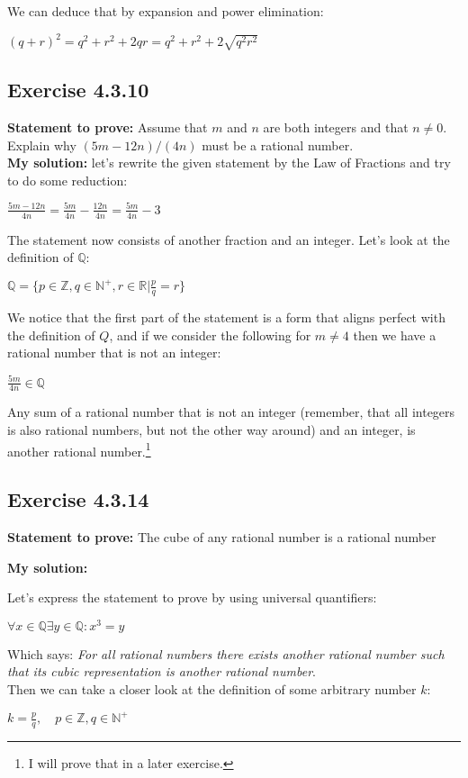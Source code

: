 \documentclass{article}
\newcommand{\cent}[1]{\begin{center}#1\end{center}}
\newcommand{\doubleR}{\mathbb{R}}
\newcommand{\doubleZ}{\mathbb{Z}}
\newcommand{\doubleN}{\mathbb{N}}
\newcommand{\doubleQ}{\mathbb{Q}}
\newcommand{\In}{\! \in \!}
\newcommand{\Prove}{\textbf{Statement to prove: }}
\newcommand{\Solution}{\textbf{My solution: }}
\newcommand{\QED}{\boxed{}}
\newcommand{\Exercise}[1]{\subsection{Exercise #1}}
\begin{document}
	 We can deduce that by expansion and power elimination:
	 
	\cent{$(q+r)^2 = q^2+r^2 + 2qr =q^2+r^2 + 2\sqrt{q^2 r^2} $}
	
	\QED	 
	
	\Exercise{4.3.10}
	
	\Prove
	Assume that $m$ and $n$ are both integers and that  $n\neq 0$. Explain why $(5m -12n)/(4n)$ must be a rational number.\\
	
	\Solution
	let's rewrite the given statement by the Law of Fractions and try to do some reduction:
	
	\cent{$\frac{5m-12n}{4n} = \frac{5m}{4n} - \frac{12n}{4n} = \frac{5m}{4n} - 3 $}
	
	The statement now consists of another fraction and an integer. Let's look at the definition of $\doubleQ$:
	
	\cent{$\doubleQ = \{p \in \doubleZ, q \in \doubleN^+, r \in \doubleR | \frac{p}{q} = r\}$}
	
	We notice that the first part of the statement is a form that aligns perfect with the definition of $Q$, and if we consider the following for $m \neq 4$ then we have a rational number that is not an integer:
	
	\cent{$\frac{5m}{4n} \in \doubleQ$} 
	
	Any sum of a rational number that is not an integer (remember, that all integers is also rational numbers, but not the other way around) and an integer, is another rational number.\footnote{I will prove that in a later exercise.}\\
	\QED
	
	\Exercise{4.3.14}
	
	\Prove
	The cube of any rational number is a rational number
	
	\Solution
	
	Let's express the statement to prove by using universal quantifiers:
	
	\cent{$\forall x \In \doubleQ \exists y \In \doubleQ : x^3 = y$}
	
	Which says: \textit{For all rational numbers there exists another rational number such that its cubic representation is another rational number}.\\
	
	Then we can take a closer look at the definition of some arbitrary number $k$:
	
	\cent{$k = \frac{p}{q}, \quad p \In \doubleZ, q \In \doubleN^+$}
	
\end{document}
